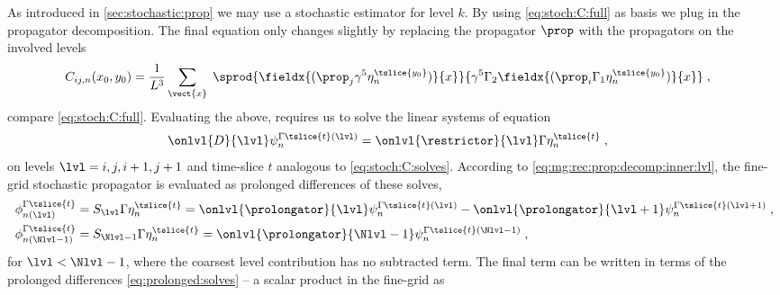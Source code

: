 As introduced in \cref{sec:stochastic:prop} we may use a stochastic estimator for level $k$.
By using \cref{eq:stoch:C:full} as basis we plug in the propagator decomposition.
The final equation only changes slightly by replacing the propagator $\prop$ with the propagators on the involved levels
\begin{align}
C_{ij,n}(x_0, y_0)
&= \frac{1}{L^{3}} \sum_{\vect{x}} \;
\sprod{
  \fieldx{(\prop_j \gamma^{5} \eta_n^{\tslice{y_0}})}{x}
}{
  \gamma^{5}
  \Gamma_2
  \fieldx{(\prop_i \Gamma_1 \eta_n^{\tslice{y_0}})}{x}
} \;,
\end{align}
compare \cref{eq:stoch:C:full}.
Evaluating the above, requires us to solve the linear systems of equation
\begin{align}
\onlvl{D}{\lvl  }
\psi_{n}^{\Gamma \tslice{t} (\lvl)} &=
\onlvl{\mathcal{\restrictor}}{\lvl  }
\Gamma \eta_n^{\tslice{t}} \;,
\end{align}
on levels $\lvl = i, j, i+1, j+1$ and time-slice $t$ analogous to \cref{eq:stoch:C:solves}.
According to \cref{eq:mg:rec:prop:decomp:inner:lvl}, the fine-grid stochastic propagator is evaluated as prolonged differences of these solves,
\begin{align} \label{eq:prolonged:solves}
\phi_{n(\lvl)}^{\Gamma \tslice{t}}
&= S_{\lvl} \Gamma \eta_n^{\tslice{t}}
= \onlvl{\mathcal{\prolongator}}{\lvl  }
  \psi_{n}^{\Gamma \tslice{t} (\lvl)}
- \onlvl{\mathcal{\prolongator}}{\lvl+1}
  \psi_{n}^{\Gamma \tslice{t} (\lvl+1)} \;, \\
\phi_{n(\Nlvl-1)}^{\Gamma \tslice{t}}
&= S_{\Nlvl-1} \Gamma \eta_n^{\tslice{t}}
= \onlvl{\mathcal{\prolongator}}{\Nlvl-1  }
  \psi_{n}^{\Gamma \tslice{t} (\Nlvl-1)} \;,
\end{align}
for $\lvl < \Nlvl-1$, where the coarsest level contribution has no subtracted term.
The final term can be written in terms of the prolonged differences \cref{eq:prolonged:solves} -- a scalar product in the fine-grid as
